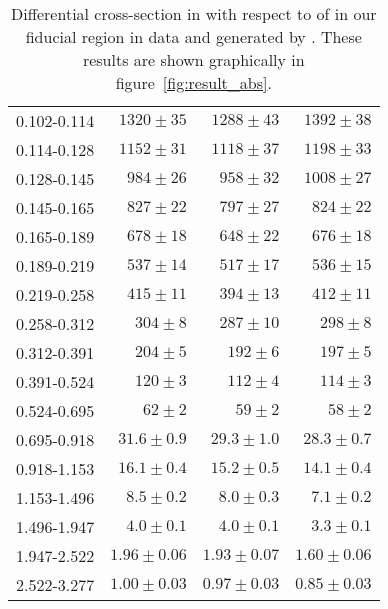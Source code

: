 \begin{table}
\begin{center}
\begin{tabular}{@{}l r r r@{}}
            0.102-0.114  &  $1320  \pm  35$    &  $1288  \pm  43$    &  $1392  \pm  38$    \\
            0.114-0.128  &  $1152  \pm  31$    &  $1118  \pm  37$    &  $1198  \pm  33$    \\
            0.128-0.145  &  $984   \pm  26$    &  $958   \pm  32$    &  $1008  \pm  27$    \\
            0.145-0.165  &  $827   \pm  22$    &  $797   \pm  27$    &  $824   \pm  22$    \\
            0.165-0.189  &  $678   \pm  18$    &  $648   \pm  22$    &  $676   \pm  18$    \\
            0.189-0.219  &  $537   \pm  14$    &  $517   \pm  17$    &  $536   \pm  15$    \\
            0.219-0.258  &  $415   \pm  11$    &  $394   \pm  13$    &  $412   \pm  11$    \\
            0.258-0.312  &  $304   \pm  8$     &  $287   \pm  10$    &  $298   \pm  8$     \\
            0.312-0.391  &  $204   \pm  5$     &  $192   \pm  6$     &  $197   \pm  5$     \\
            0.391-0.524  &  $120   \pm  3$     &  $112   \pm  4$     &  $114   \pm  3$     \\
            0.524-0.695  &  $62    \pm  2$     &  $59    \pm  2$     &  $58    \pm  2$     \\
            0.695-0.918  &  $31.6  \pm  0.9$   &  $29.3  \pm  1.0$   &  $28.3  \pm  0.7$   \\
            0.918-1.153  &  $16.1  \pm  0.4$   &  $15.2  \pm  0.5$   &  $14.1  \pm  0.4$   \\
            1.153-1.496  &  $8.5   \pm  0.2$   &  $8.0   \pm  0.3$   &  $7.1   \pm  0.2$   \\
            1.496-1.947  &  $4.0   \pm  0.1$   &  $4.0   \pm  0.1$   &  $3.3   \pm  0.1$   \\
            1.947-2.522  &  $1.96  \pm  0.06$  &  $1.93  \pm  0.07$  &  $1.60  \pm  0.06$  \\
            2.522-3.277  &  $1.00  \pm  0.03$  &  $0.97  \pm  0.03$  &  $0.85  \pm  0.03$  \\
            \bottomrule
        \end{tabular}
    \end{center}
    \caption[
        Differential cross-section in \pb with respect to \phistar of \Ztoee.
    ]{
        Differential cross-section in \pb with respect to \phistar of \Ztoee in our
        fiducial region in data and generated by \MADGRAPH. These results are shown
        graphically in figure~\ref{fig:result_abs}.
    }
    \label{tab:results_abs}
\end{table}
